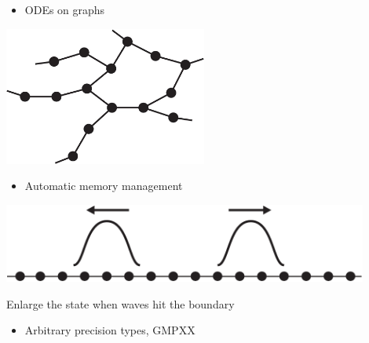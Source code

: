 \begin{frame}[fragile]


\vspace{2ex}

\begin{minipage}[c]{0.35\textwidth}
\begin{itemize}\item ODEs on graphs\end{itemize}
\end{minipage} \hspace{1ex}
\begin{minipage}[c]{0.6\textwidth}
\includegraphics[draft=false,width=0.5\textwidth]{graph.jpg}
\end{minipage}
\pause

\vspace{2ex}
\begin{minipage}[c]{0.35\textwidth}
\begin{itemize}\item Automatic memory management\end{itemize}
\end{minipage} \hspace{1ex}
\begin{minipage}[c]{0.6\textwidth}
\includegraphics[draft=false,width=0.9\textwidth]{self_expanding_lattice.pdf}

\vspace{0.5ex}
{\scriptsize Enlarge the state when waves hit the boundary}
\end{minipage}
\pause

\vspace{2ex}
\begin{itemize}\item Arbitrary precision types, GMPXX\end{itemize}



\end{frame}
